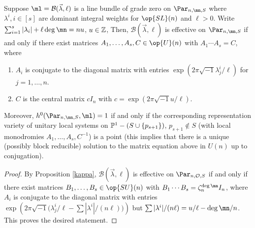 \begin{corollary}
\notready\label{sansD}
Suppose  $\ml=\mathcal{B}(\vec{\lambda},\ell)$ is a line bundle of grade zero on  $\Par_{n,\mn,S}$ where $\lambda^i, i\in[s]$ are dominant integral weights for $\op{SL}(n)$ and $\ell>0$. Write  $\sum_{i=1}^s|\lambda_i|+ \ell \deg\mn=nu$, $u\in \Bbb{Z}$, Then, $\mathcal{B}(\vec{\lambda},\ell)$
is effective on   $\Par_{n,\mn,S}$  if and only if there exist matrices $A_1,\dots,A_s,C\in \op{U}(n)$ with $A_1\cdots A_s=C$, where
\begin{enumerate}
\item $A_i$ is conjugate to the diagonal matrix with entries $\exp(2\pi\sqrt{-1}\lambda^i_j/\ell)$ for $j=1,\dots,n$.
\item $C$ is the central matrix $c I_n$ with $c=\exp(2\pi\sqrt{-1}u/\ell)$.
\end{enumerate}
Moreover,  $h^0(\Par_{n,\mn,S},\ml)=1$ if and only if the corresponding representation variety of unitary local systems  on $\Bbb{P}^1-(S\cup\{p_{s+1}\})$, $p_{s+1}\not\in S$ (with local monodromies $A_1,\dots,A_s, C^{-1}$) is a point (this implies that there is a unique (possibly block reducible) solution to the matrix equation above in $U(n)$ up to conjugation).
\end{corollary}
\begin{proof}
By Proposition \ref{kappa}, $\mathcal{B}(\vec{\lambda},\ell)$
is effective on   $\Par_{n,\mathcal{O},S}$  if and only if there exist matrices $B_1,\dots,B_s\in \op{SU}(n)$ with $B_1\cdots B_s=\zeta_n^{\deg \mn}I_n$, where $A_i$ is conjugate to the diagonal matrix with entries $\exp(2\pi\sqrt{-1}\bigl(\lambda^i_j/{\ell}-\sum |\lambda^i|/(n\ell)\bigr))$ but
$\sum |\lambda^i|/(n\ell)=u/\ell - \deg\mn/n$. This proves the desired statement.

\end{proof}


